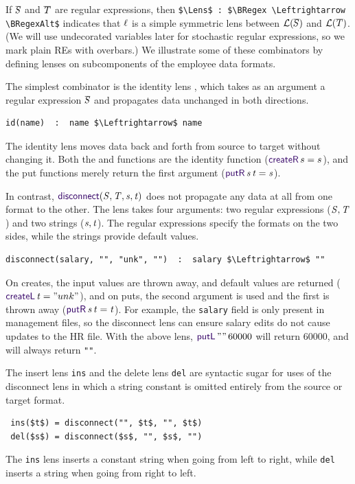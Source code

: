 \documentclass[12pt]{article}
\begin{document}
{If $\BRegex$ and $\BRegexAlt$ are regular expressions, then
\lstinline{$\Lens$ : $\BRegex \Leftrightarrow \BRegexAlt$} indicates that
$\mathit{\ell}$ is a simple symmetric lens between $\LanguageOf{\BRegex}$ and
$\LanguageOf{\BRegexAlt}$. (We will use undecorated variables later for
stochastic regular expressions, so we mark plain REs with overbars.)
We illustrate some of these
combinators by defining lenses on subcomponents of the employee data formats.

The simplest combinator is the identity lens \IdentityLens, which takes as an
argument a regular expression $\BRegex$ and propagates data unchanged
in both directions.
%
\begin{lstlisting}
id(name)  :  name $\Leftrightarrow$ name
\end{lstlisting}
%
The identity lens moves data back and forth from source to target without
changing it. Both the \CreateR and \CreateL functions are the identity function
($\CreateR \App s = s$), and the put functions merely return the first argument
($\PutROf{\String}{\StringAlt} = \String$).

In contrast, $\DisconnectOf{\Regex}{\RegexAlt}{\String}{\StringAlt}$ does not propagate any data at all
from one format to the other.  The \Disconnect lens takes four arguments: two
regular expressions ($\mathit{S}, \mathit{T}$) and two strings ($\mathit{s}, \mathit{t}$). The regular expressions specify the formats
on the two sides, while the strings provide default values. 
%
\begin{lstlisting}
disconnect(salary, "", "unk", "")  :  salary $\Leftrightarrow$ ""
\end{lstlisting}
%
On creates, the input values are thrown away, and default values are
returned ($\CreateLOf{\StringAlt} =
\lstinline{"unk"}$), and on puts, the second argument is used and the first is
thrown away ($\PutROf{\String}{\StringAlt} = \StringAlt$). For 
example, the \lstinline{salary} field is only present in management files,
so the disconnect lens can ensure salary edits do not cause updates to the
HR file.
With the above lens, $\PutL \App \lstinline{""} \App 60000$ will return 60000,
and \PutR will always return \lstinline{""}.

The insert lens \lstinline{ins} and the delete lens \lstinline{del} are
syntactic sugar for uses of the disconnect lens in which a string
constant is omitted entirely from the source or target format.
\begin{lstlisting}
 ins($t$) = disconnect("", $t$, "", $t$)
 del($s$) = disconnect($s$, "", $s$, "")
\end{lstlisting}
The \lstinline{ins} lens inserts a constant string when going from
left to right, while \lstinline{del} inserts a string when going from right
to left.

}
\end{document}
